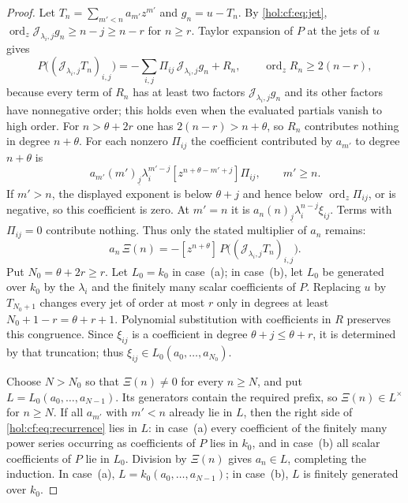 \documentclass[11pt]{article}
\numberwithin{equation}{section}
\theoremstyle{definition}
\theoremstyle{remark}
\newcommand{\fall}[2]{(#1)_{\underline{#2}}}
\newcommand{\ordz}{\operatorname{ord}_z}
\newcommand{\coeffz}[2]{[z^{#1}]\,#2}
\newcommand{\jet}[2]{\mathcal J_{#1,#2}}
\begin{document}
\begin{proof}
Let $T_n=\sum_{m'<n}a_{m'}z^{m'}$ and $g_n=u-T_n$. By \eqref{hol:cf:eq:jet},
$\ordz\jet{\lambda_i}jg_n\ge n-j\ge n-r$ for $n\ge r$. Taylor expansion of $P$
at the jets of $u$ gives
\begin{equation}\label{hol:cf:eq:taylor}
 P\bigl((\jet{\lambda_i}jT_n)_{i,j}\bigr)
 =-\sum_{i,j}\Pi_{ij}\,\jet{\lambda_i}jg_n+R_n,\qquad
 \ordz R_n\ge2(n-r),
\end{equation}
because every term of $R_n$ has at least two factors $\jet{\lambda_i}jg_n$
and its other factors have nonnegative order; this holds even when the
evaluated partials vanish to high order. For $n>\theta+2r$ one has
$2(n-r)>n+\theta$, so $R_n$ contributes nothing in degree $n+\theta$.
For each nonzero $\Pi_{ij}$ the coefficient contributed by $a_{m'}$ to
degree $n+\theta$ is
\[
 a_{m'}\fall{m'}j\lambda_i^{m'-j}
 [z^{n+\theta-m'+j}]\Pi_{ij},\qquad m'\ge n.
\]
If $m'>n$, the displayed exponent is below $\theta+j$ and hence below
$\ordz\Pi_{ij}$, or is negative, so this coefficient is zero. At $m'=n$
it is $a_n\fall nj\lambda_i^{n-j}\xi_{ij}$. Terms with $\Pi_{ij}=0$
contribute nothing. Thus only the stated multiplier of $a_n$ remains:
\begin{equation}\label{hol:cf:eq:recurrence}
 a_n\,\Xi(n)=-\coeffz{n+\theta}{P\bigl((\jet{\lambda_i}jT_n)_{i,j}\bigr)}.
\end{equation}
Put $N_0=\theta+2r\ge r$. Let $L_0=k_0$ in case~(a); in case~(b), let
$L_0$ be generated over $k_0$ by the $\lambda_i$ and the finitely many
scalar coefficients of $P$. Replacing $u$ by $T_{N_0+1}$ changes every jet
of order at most $r$ only in degrees at least
$N_0+1-r=\theta+r+1$. Polynomial substitution with coefficients in $R$
preserves this congruence. Since $\xi_{ij}$ is a coefficient in degree
$\theta+j\le\theta+r$, it is determined by that truncation; thus
$\xi_{ij}\in L_0(a_0,\ldots,a_{N_0})$.

Choose $N>N_0$ so that $\Xi(n)\ne0$ for every $n\ge N$, and put
$L=L_0(a_0,\ldots,a_{N-1})$. Its generators contain the required prefix,
so $\Xi(n)\in L^\times$ for $n\ge N$. If all $a_{m'}$ with $m'<n$
already lie in $L$, then the right side of
\eqref{hol:cf:eq:recurrence} lies in $L$: in case~(a) every coefficient
of the finitely many power series occurring as coefficients of $P$ lies
in $k_0$, and in case~(b) all scalar coefficients of $P$ lie in $L_0$.
Division by $\Xi(n)$ gives $a_n\in L$, completing the induction.
In case~(a), $L=k_0(a_0,\ldots,a_{N-1})$; in case~(b), $L$ is finitely
generated over $k_0$.
\end{proof}
\end{document}

